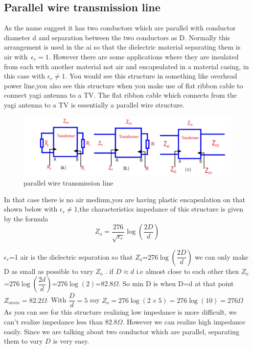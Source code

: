 \subsection{Parallel wire transmission line} 
As the name suggest it has two conductors which are parallel with conductor diameter d and separation between the two conductors as D. Normally this arrangement is used in the ai so that the dielectric material separating them is air with\ $\epsilon_r=1$. However  there are some applications where they are insulated from each with another material not air and encapsulated in a material casing, in this case with $\epsilon_r\neq1$. You would see this structure in something like overhead power line,you also see this structure when you make use of flat ribbon cable to connect yagi antenna to a TV. The flat ribbon cable which connects from the yagi antenna to a TV is essentially a parallel wire structure.
\begin{figure}[h]
\centering
\includegraphics[width=1\linewidth]{./graphics/FIG8}
\caption{parallel wire transmission line}
\end{figure}


In that case there is no air medium,you are having plastic encapsulation on that shown below with  $\epsilon_r\neq1$,the characteristics impedance of this structure is given by the formula 
\begin{equation*}
Z_o=\dfrac{276}{\sqrt{\epsilon_r}}\log(\dfrac{2D}{d})
\end{equation*}

$\epsilon_r$=1 air is the dielectric separation so that $Z_o$=$276\log(\dfrac{2D}{d})$ we can only make D as small as possible to vary $Z_o$ . if $D\approx d$ i.e almost close to each other then $Z_o$=$276\log(\dfrac{2d}{d})$=$276\log(2)$=$82.8\Omega$. So min D is when D=d at that point $Z_{omin}=82.2\Omega$. With $\dfrac{D}{d}=5$ say $Z_o=276\log(2\times5)=276\log(10)=276\Omega$ As you can see for this structure realizing low impedance is more difficult, we can't realize impedance less than $82.8\Omega$. However we can realize high impedance easily. Since we are talking about two conductor which are parallel, separating them to vary $D$ is very easy.

